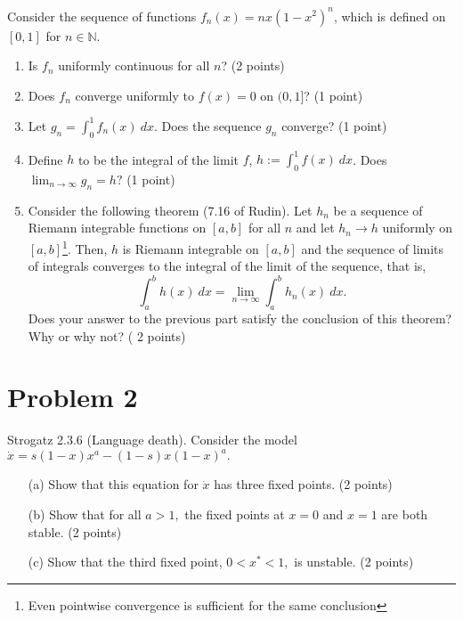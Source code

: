 \documentclass[12pt]{article}
\begin{document}
Consider the sequence of functions $f_n(x) = n x (1-x^2)^n$, which is defined on $[0,1]$ for $ n \in \mathbb{N}$.
\begin{enumerate}
	\item Is $f_n$ uniformly continuous for all $n$? (2 points)
	\item Does $f_n$ converge uniformly to $f(x) = 0$ on $(0,1]$? (1 point)
	\item Let $g_n = \int_0^1 f_n(x) \: dx$. Does the sequence $g_n$ converge?  (1 point)
	\item Define $h$ to be the integral of the limit $f$, $h := \int_0^1 f(x) \: dx$. Does $\lim_{n\to \infty} g_n = h?$ (1 point)
	\item Consider the following theorem (7.16 of Rudin). Let $h_n$ be a sequence of Riemann integrable functions on $[a,b]$ for all $n$ and let $h_n \to h$ uniformly on $[a,b]$\footnote{Even pointwise convergence is sufficient for the same conclusion}. Then, $h$ is Riemann integrable on $[a,b]$ and the sequence of limits of integrals converges to the integral of the limit of the sequence, that is,
		$$ \int_a^b h(x) \: dx = \lim_{n\to\infty} \int_a^b h_n(x) \: dx.$$ 
Does your answer to the previous part satisfy the conclusion of this theorem? Why or why not? ( 2 points)
\end{enumerate}


\section*{Problem 2}

Strogatz 2.3.6 (Language death). Consider the model 
$\dot{x} = s(1-x)x^a - (1-s)x(1-x)^a.$

\begin{enumerate}
	\item[(a)] Show that this equation for $\dot{x}$ has three fixed points. (2 points)
	\item[(b)] Show that for all $a > 1,$ the fixed points at $x =0$ and $x= 1$ are both stable. (2 points)
	\item[(c)] Show that the third fixed point, $0 < x^* < 1,$ is unstable. (2 points)
\end{enumerate}
\end{document}
